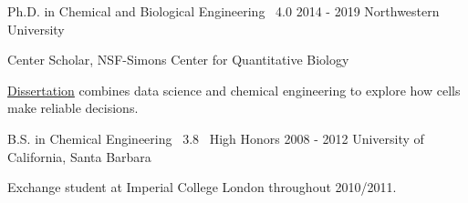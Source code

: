 

\begin{cventries}

  \cventrynew
	{Ph.D. in Chemical and Biological Engineering \bullet\ 4.0} 	
	{2014 - 2019}
	{Northwestern University}
    { \begin{cvitems} 
      	\item {Center Scholar, NSF-Simons Center for Quantitative Biology}
      	\item {\href{https://github.com/sebastianbernasek/dissertation}{Dissertation} combines data science and chemical engineering to explore how cells make reliable decisions.}
      \end{cvitems}}
            	   
    
  \cventrynew
	{B.S. in Chemical Engineering \bullet\ 3.8 \bullet\ High Honors} 	
	{2008 - 2012} 	
	{University of California, Santa Barbara}    
    {
      \begin{cvitems} %
      	\item {Exchange student at Imperial College London throughout 2010/2011.}      	
      \end{cvitems}
    }

\end{cventries}
